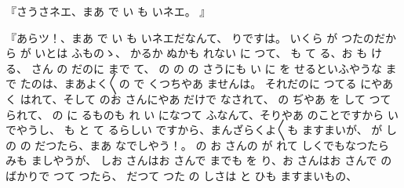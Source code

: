 『さうさネエ、まあ
で
い
も
いネエ。
』

『あらツ！、まあ
で
い
も
いネエだなんて、
りですは。
いくら
が
つたのだから
が
いとは
ふものゝ、
かるか
ぬかも
れない
に
つて、
も
て
る、お
も
ける、
さん
の
だのに
まで
て、
の
の
の
さうにも
い
に
を
せるといふやうな
まで
たのは、まあよく〳〵の
で
くつちやあ
ませんは。
それだのに
つてる
にやあ
く
はれて、そして
のお
さんにやあ
だけで
なされて、
の
ぢやあ
を
して
つて
られて、
の
に
るものも
れ
い
になつて
ふなんて、そりやあ
のことですから
いでやうし、
も
と
て
るらしい
ですから、まんざらくよ〳〵も
ますまいが、
が
し
の
の
だつたら、まあ
なでしやう！。
の
お
さんの
が
れて
しくでもなつたら
みも
ましやうが、
しお
さんはお
さんで
までも
を
り、お
さんはお
さんで
の
ばかりで
つて
つたら、
だつて
つた
の
しさは
と
ひも
ますまいもの、
